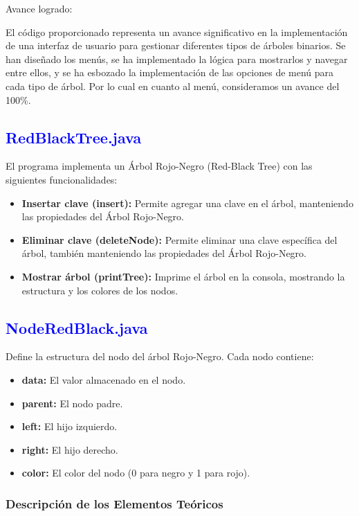 \documentclass[12pt]{article}
\begin{document}
Avance logrado:
\par\vspace{0cm}
El código proporcionado representa un avance significativo en la implementación de una interfaz de usuario para gestionar diferentes tipos de árboles binarios. Se han diseñado los menús, se ha implementado la lógica para mostrarlos y navegar entre ellos, y se ha esbozado la implementación de las opciones de menú para cada tipo de árbol. Por lo cual en cuanto al menú, consideramos un avance del 100\%.

\subsection{\textcolor{blue}{RedBlackTree.java}}
El programa implementa un Árbol Rojo-Negro (Red-Black Tree) con las siguientes funcionalidades:
\begin{itemize}
    \item \textbf{Insertar clave (insert):} Permite agregar una clave en el árbol, manteniendo las propiedades del Árbol Rojo-Negro.
    \item \textbf{Eliminar clave (deleteNode):} Permite eliminar una clave específica del árbol, también manteniendo las propiedades del Árbol Rojo-Negro.
    \item \textbf{Mostrar árbol (printTree):} Imprime el árbol en la consola, mostrando la estructura y los colores de los nodos.
\end{itemize}

\subsection{\textcolor{blue}{NodeRedBlack.java}}
Define la estructura del nodo del árbol Rojo-Negro. Cada nodo contiene:
\begin{itemize}
    \item \textbf{data:} El valor almacenado en el nodo.
    \item \textbf{parent:} El nodo padre.
    \item \textbf{left:} El hijo izquierdo.
    \item \textbf{right:} El hijo derecho.
    \item \textbf{color:} El color del nodo (0 para negro y 1 para rojo).
\end{itemize}

\subsubsection{Descripción de los Elementos Teóricos}
\end{document}

